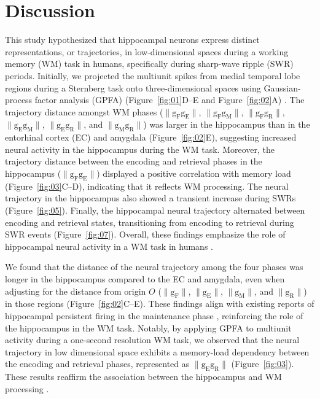 \documentclass[final,3p,times,twocolumn]{elsarticle}
\begin{document}
    \section{Discussion}
This study hypothesized that hippocampal neurons express distinct representations, or trajectories, in low-dimensional spaces during a working memory (WM) task in humans, specifically during sharp-wave ripple (SWR) periods. Initially, we projected the multiunit spikes from medial temporal lobe regions during a Sternberg task onto three-dimensional spaces using Gaussian-process factor analysis (GPFA) (Figure~\ref{fig:01}D--E and Figure~\ref{fig:02}A) \cite{yu_gaussian-process_2009}. The trajectory distance amongst WM phases ($\mathrm{\lVert g_{F}g_{E} \rVert}$, $\mathrm{\lVert g_{F}g_{M} \rVert}$, $\mathrm{\lVert g_{F}g_{R} \rVert}$, $\mathrm{\lVert g_{E}g_{M} \rVert}$, $\mathrm{\lVert g_{E}g_{R} \rVert}$, and $\mathrm{\lVert g_{M}g_{R} \rVert}$) was larger in the hippocampus than in the entorhinal cortex (EC) and amygdala (Figure~\ref{fig:02}E), suggesting increased neural activity in the hippocampus during the WM task. Moreover, the trajectory distance between the encoding and retrieval phases in the hippocampus ($\mathrm{\lVert g_{F}g_{E} \rVert}$) displayed a positive correlation with memory load (Figure~\ref{fig:03}C--D), indicating that it reflects WM processing. The neural trajectory in the hippocampus also showed a transient increase during SWRs (Figure~\ref{fig:05}). Finally, the hippocampal neural trajectory alternated between encoding and retrieval states, transitioning from encoding to retrieval during SWR events (Figure~\ref{fig:07}). Overall, these findings emphasize the role of hippocampal neural activity in a WM task in humans \cite{naber_reciprocal_2001,van_strien_anatomy_2009,strange_functional_2014}.

We found that the distance of the neural trajectory among the four phases was longer in the hippocampus compared to the EC and amygdala, even when adjusting for the distance from origin $O$ ($\mathrm{\lVert g_{F} \rVert}$, $\mathrm{\lVert g_{E} \rVert}$, $\mathrm{\lVert g_{M} \rVert}$, and $\mathrm{\lVert g_{R} \rVert}$) in those regions (Figure~\ref{fig:02}C--E). These findings align with existing reports of hippocampal persistent firing in the maintenance phase \cite{boran_persistent_2019} \cite{kaminski_persistently_2017} \cite{kornblith_persistent_2017} \cite{faraut_dataset_2018}, reinforcing the role of the hippocampus in the WM task. Notably, by applying GPFA to multiunit activity during a one-second resolution WM task, we observed that the neural trajectory in low dimensional space exhibits a memory-load dependency between the encoding and retrieval phases, represented as $\mathrm{\lVert g_{E}g_{R} \rVert}$ (Figure~\ref{fig:03}). These results reaffirm the association between the hippocampus and WM processing \cite{oso_boran_2020}.
\end{document}
